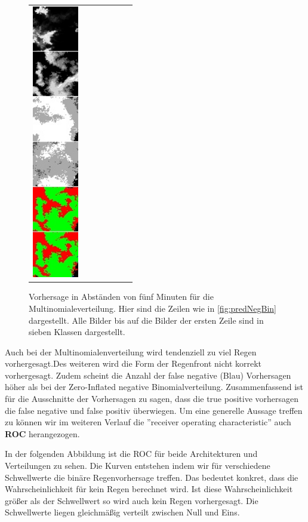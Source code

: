 \begin{figure}[h]
\begin{tabular}{lllllll}
\includegraphics[width=20mm]{abb/prediction/106_cat_maxCont}
\end{tabular}
\caption{Vorhersage in Abständen von fünf Minuten für die Multinomialeverteilung. Hier sind die Zeilen wie in \ref{fig:predNegBin} dargestellt. Alle Bilder bis auf die Bilder der ersten Zeile sind in sieben Klassen dargestellt.\label{fig:predCat}}
\end{figure}


\noindent Auch bei der Multinomialenverteilung wird tendenziell zu viel Regen vorhergesagt.Des weiteren wird die Form der Regenfront nicht korrekt vorhergesagt. Zudem scheint die Anzahl der false negative (Blau) Vorhersagen höher als bei der Zero-Inflated negative Binomialverteilung. Zusammenfassend ist für die Ausschnitte der Vorhersagen zu sagen, dass die true positive vorhersagen die false negative und false positiv überwiegen. Um eine generelle Aussage treffen zu können wir im weiteren Verlauf die ''receiver operating characteristic'' auch \textbf{ROC} herangezogen.
\newpage

\noindent In der folgenden Abbildung ist die ROC für beide Architekturen und Verteilungen zu sehen. Die Kurven entstehen indem wir für verschiedene Schwellwerte die binäre Regenvorhersage treffen. Das bedeutet konkret, dass die Wahrscheinlichkeit für kein Regen berechnet wird. Ist diese Wahrscheinlichkeit größer als der Schwellwert so wird auch kein Regen vorhergesagt.
Die Schwellwerte liegen gleichmäßig verteilt zwischen Null und Eins.


